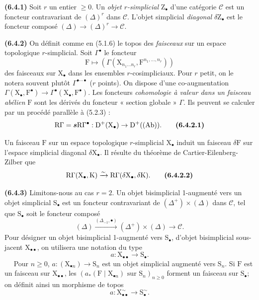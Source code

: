 \documentclass[11pt,leqno]{article}
\newcommand{\Page}[1]{\ifvmode\noindent\else\unskip\ \fi{\footnotesize\textcolor{gray}{[p.\,#1]}}\ \ignorespaces}
\begin{document}
\textbf{(6.4.1)} Soit \(r\) un entier \(\geq 0\). Un \textit{objet \(r\)-simplicial} \(\mathrm{Z}_{\bullet}\) d’une catégorie \(\mathscr{C}\) est un foncteur contravariant de \((\Delta)^r\) dans \(\mathscr{C}\). L’objet simplicial \textit{diagonal} \(\delta\mathrm{Z}_{\bullet}\) est le foncteur composé \((\Delta)\to(\Delta)^r\to\mathscr{C}\).

\textbf{(6.4.2)} On définit comme en (5.1.6) le topos des \textit{faisceaux} sur un espace topologique \(r\)-simplicial. Soit \(\Gamma^{\bullet}\) le foncteur
\[
\mathrm{F}\mapsto
(\Gamma(\mathrm{X}_{n_1\ldots n_r},\mathrm{F}^{n_1,\ldots,n_r}))
\]
des faisceaux sur \(\mathrm{X}_{\bullet}\) dans les ensembles \(r\)-cosimpliciaux. Pour \(r\) petit, on le notera souvent plutôt \(\Gamma^{\bullet\cdots\bullet}\) (\(r\) points). On dispose d’une co-augmentation \(\Gamma(\mathrm{X}_{\bullet},\mathrm{F}^{\bullet})\to\Gamma^{\bullet}(\mathrm{X}_{\bullet},\mathrm{F}^{\bullet})\). Les foncteurs \textit{cohomologie à valeur dans un faisceau abélien} \(\mathrm{F}\) sont les dérivés du foncteur « section globale » \(\Gamma\). Ils peuvent se calculer par un procédé parallèle à (5.2.3) :
\[
\mathrm{R}\Gamma=\boldsymbol{s}\mathrm{R}\Gamma^{\bullet}:
\mathrm{D}^{+}(\mathrm{X}_{\bullet})\to\mathrm{D}^{+}((\mathrm{Ab})).
\tag*{\textbf{(6.4.2.1)}}
\]

Un faisceau \(\mathrm{F}\) sur un espace topologique \(r\)-simplicial \(\mathrm{X}_{\bullet}\) induit un faisceau \(\delta\mathrm{F}\) sur l’espace simplicial diagonal \(\delta\mathrm{X}_{\bullet}\). Il résulte du théorème de Cartier-Eilenberg-Zilber que
\[
\mathrm{R}\Gamma(\mathrm{X}_{\bullet},\mathrm{K})
\xrightarrow{\sim}
\mathrm{R}\Gamma(\delta\mathrm{X}_{\bullet},\delta\mathrm{K}).
\tag*{\textbf{(6.4.2.2)}}
\]

\textbf{(6.4.3)} Limitons-nous au cas \(r=2\). Un objet bisimplicial 1-augmenté vers un objet simplicial \(\mathrm{S}_{\bullet}\) est un foncteur contravariant de \((\Delta^{+})\times(\Delta)\) dans \(\mathscr{C}\), tel que \(\mathrm{S}_{\bullet}\) soit le foncteur composé
\[
(\Delta)\xrightarrow{(\Delta_{-1},\bullet)}
(\Delta^{+})\times(\Delta)\longrightarrow\mathscr{C}.
\]
Pour désigner un objet bisimplicial 1-augmenté vers \(\mathrm{S}_{\bullet}\), d’objet bisimplicial sous-jacent \(\mathrm{X}_{\bullet\bullet}\), on utilisera une notation du type
\[
a:\mathrm{X}_{\bullet\bullet}\to\mathrm{S}_{\bullet}.
\]
\Page{23}
Pour \(n\geq 0\), \(a:(\mathrm{X}_{\bullet n})\to\mathrm{S}_n\) est un objet simplicial augmenté vers \(\mathrm{S}_n\). Si \(\mathrm{F}\) est un faisceau sur \(\mathrm{X}_{\bullet\bullet}\), les \((a_{\ast}(\mathrm{F}\mid\mathrm{X}_{\bullet n})\text{ sur }\mathrm{S}_n)_{n\geq 0}\) forment un faisceau sur \(\mathrm{S}_{\bullet}\); on définit ainsi un morphisme de topos
\[
a:\mathrm{X}_{\bullet\bullet}^{\sim}\to\mathrm{S}_{\bullet}^{\sim}.
\]
\end{document}
